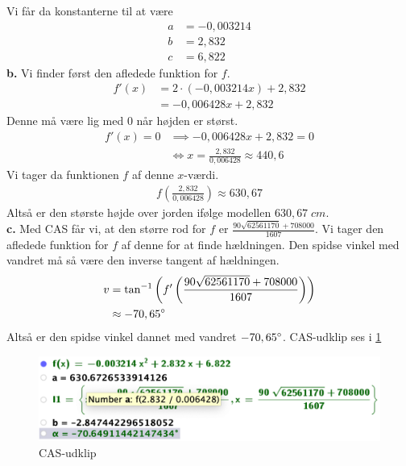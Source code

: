 \documentclass{article}
\begin{document}
Vi får da konstanterne til at være
\begin{equation*}
\begin{split}
  a&=-0,003214\\ 
  b&=2,832\\ 
  c&=6,822
\end{split}
\end{equation*}
\textbf{b.}
Vi finder først den afledede funktion for $f$.
\begin{equation*}
\begin{split}
f'(x)&=2 \cdot (-0,003214x) +2,832\\
  &=-0,006428x + 2,832
\end{split}
\end{equation*}
Denne må være lig med 0 når højden er størst.
\begin{equation*}
\begin{split}
  f'(x)=0 &\implies -0,006428x + 2,832=0\\ 
  &\iff x=\frac{2,832}{0,006428}\approx 440,6
\end{split}
\end{equation*}
Vi tager da funktionen $f$ af denne $x$-værdi. 
\begin{equation*}
\begin{split}
  f\left(\frac{2,832}{0,006428}\right) \approx 630,67
\end{split}
\end{equation*}
Altså er den største højde over jorden ifølge modellen $630,67 \;\unit{cm} $.\\[1ex]
\textbf{c.}
Med CAS får vi, at den større rod for $f$ er $\frac{90 \sqrt{62561170} +708000}{1607}$. 
Vi tager den afledede funktion for $f$ af denne for at finde hældningen. 
Den spidse vinkel med vandret må så være den inverse tangent af hældningen.
\begin{equation*}
\begin{split}
  v&=\tan^{-1}\left(f'\left(\frac{90 \sqrt{62561170} +708000}{1607}\right)\right) \\ 
  &\approx -70,65 \degree 
\end{split}
\end{equation*}
Altså er den spidse vinkel dannet med vandret $-70,65 \degree$.
CAS-udklip ses i \cref{fig:CAS}
\begin{figure}[H]
\begin{center}
  \includegraphics[scale=0.5]{CAS.png}
\end{center}
\caption{CAS-udklip}
\label{fig:CAS}
\end{figure}
\end{document}
